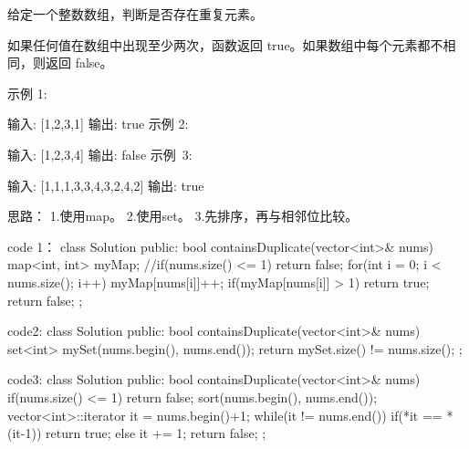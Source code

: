 给定一个整数数组，判断是否存在重复元素。

如果任何值在数组中出现至少两次，函数返回 true。如果数组中每个元素都不相同，则返回 false。

示例 1:

输入: [1,2,3,1]
输出: true
示例 2:

输入: [1,2,3,4]
输出: false
示例 3:

输入: [1,1,1,3,3,4,3,2,4,2]
输出: true




















思路：
1.使用map。
2.使用set。
3.先排序，再与相邻位比较。





















code 1：
class Solution {
public:
    bool containsDuplicate(vector<int>& nums) {
        map<int, int> myMap;
        //if(nums.size() <= 1) return false;
        for(int i = 0; i < nums.size(); i++)
        {
            myMap[nums[i]]++;
            if(myMap[nums[i]] > 1) return true; 
        }
        return false;
    }
};
















code2:
class Solution {
public:
    bool containsDuplicate(vector<int>& nums) {
        set<int> mySet(nums.begin(), nums.end());
        return mySet.size() != nums.size();
    }
};






















code3:
class Solution {
public:
    bool containsDuplicate(vector<int>& nums) {
        if(nums.size() <= 1) return false;
        sort(nums.begin(), nums.end());
        vector<int>::iterator it = nums.begin()+1;
        while(it != nums.end())
        {
            if(*it == *(it-1))
                return true;
            else it += 1;
        }
        return false;
    }
};